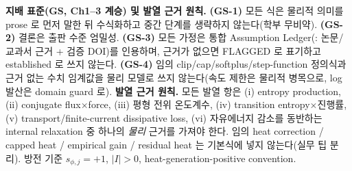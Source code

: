 \begin{groundingbox}
\textbf{지배 표준(GS, Ch1--3 계승) 및 발열 근거 원칙.} \textbf{(GS-1)} 모든 식은 물리적 의미를 prose 로 먼저
말한 뒤 수식화하고 중간 단계를 생략하지 않는다(학부 무비약). \textbf{(GS-2)} 결론은 출판 수준 엄밀성.
\textbf{(GS-3)} 모든 가정은 통합 Assumption Ledger(\AL{\#}: 논문/교과서 근거 + 검증 DOI)를 인용하며, 근거가
없으면 FLAGGED 로 표기하고 established 로 쓰지 않는다. \textbf{(GS-4)} 임의 clip/cap/softplus/step-function
정의식과 근거 없는 수치 임계값을 물리 모델로 쓰지 않는다(속도 제한은 물리적 병목으로, log 발산은 domain guard
로). \textbf{발열 근거 원칙.} 모든 발열 항은 (i) entropy production, (ii) conjugate flux$\times$force, (iii)
평형 전위 온도계수, (iv) transition entropy$\times$진행률, (v) transport/finite-current dissipative loss, (vi)
자유에너지 감소를 동반하는 internal relaxation 중 하나의 \emph{물리} 근거를 가져야 한다. 임의 heat correction /
capped heat / empirical gain / residual heat 는 기본식에 넣지 않는다(실무 팁 분리). 방전 기준 $s_{\phi,j}=+1$,
$|I|>0$, heat-generation-positive convention.
\end{groundingbox}

